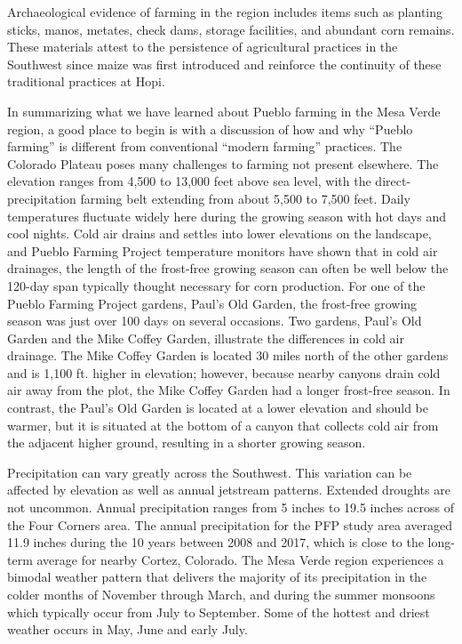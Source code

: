 \documentclass[12pt,]{article}
\begin{document}
Archaeological evidence of farming in the region includes items such as planting sticks, manos, metates, check dams, storage facilities, and abundant corn remains. These materials attest to the persistence of agricultural practices in the Southwest since maize was first introduced and reinforce the continuity of these traditional practices at Hopi.

In summarizing what we have learned about Pueblo farming in the Mesa Verde region, a good place to begin is with a discussion of how and why ``Pueblo farming'' is different from conventional ``modern farming'' practices. The Colorado Plateau poses many challenges to farming not present elsewhere. The elevation ranges from 4,500 to 13,000 feet above sea level, with the direct-precipitation farming belt extending from about 5,500 to 7,500 feet. Daily temperatures fluctuate widely here during the growing season with hot days and cool nights. Cold air drains and settles into lower elevations on the landscape, and Pueblo Farming Project temperature monitors have shown that in cold air drainages, the length of the frost-free growing season can often be well below the 120-day span typically thought necessary for corn production. For one of the Pueblo Farming Project gardens, Paul's Old Garden, the frost-free growing season was just over 100 days on several occasions. Two gardens, Paul's Old Garden and the Mike Coffey Garden, illustrate the differences in cold air drainage. The Mike Coffey Garden is located 30 miles north of the other gardens and is 1,100 ft. higher in elevation; however, because nearby canyons drain cold air away from the plot, the Mike Coffey Garden had a longer frost-free season. In contrast, the Paul's Old Garden is located at a lower elevation and should be warmer, but it is situated at the bottom of a canyon that collects cold air from the adjacent higher ground, resulting in a shorter growing season.

Precipitation can vary greatly across the Southwest. This variation can be affected by elevation as well as annual jetstream patterns. Extended droughts are not uncommon. Annual precipitation ranges from 5 inches to 19.5 inches across of the Four Corners area. The annual precipitation for the PFP study area averaged 11.9 inches during the 10 years between 2008 and 2017, which is close to the long-term average for nearby Cortez, Colorado. The Mesa Verde region experiences a bimodal weather pattern that delivers the majority of its precipitation in the colder months of November through March, and during the summer monsoons which typically occur from July to September. Some of the hottest and driest weather occurs in May, June and early July.
\end{document}
